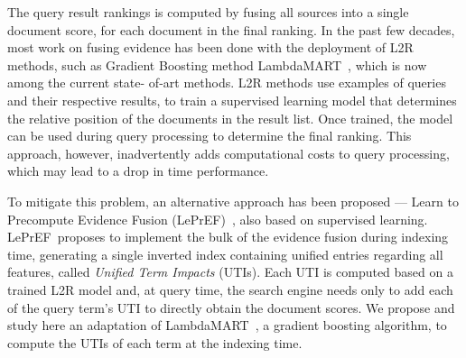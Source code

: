 \documentclass[preprint,review,10pt,3p]{elsarticle}
\begin{document}

The query result rankings is computed by fusing all sources into a single document score, for each document in the final ranking. In the past few decades, most work on fusing evidence has been done with the deployment of L2R methods, such as  Gradient Boosting method LambdaMART~\cite{wu2010lambdamart}, which is now among the current state- of-art methods. L2R methods use examples of queries and their respective results, to train a supervised learning model that determines the relative position of the documents in the result list. Once trained, the model can be used during query processing to determine the final ranking. This approach, however, inadvertently adds computational costs to query processing, which may lead to a drop in time  performance.


\newcommand{\lepref}{LePrEF}
\newcommand{\lambdamart}{LambdaMART}

To mitigate this problem, an alternative approach has been proposed --- Learn to Precompute Evidence Fusion (\lepref)~\cite{costa2012lepref}, also based on supervised learning. \lepref\ proposes to implement the bulk of the evidence fusion during indexing time, generating a single inverted index containing unified entries regarding all features, called \textit{Unified Term Impacts} (UTIs). 
Each UTI is computed based on a trained L2R model and, at query time, the search engine needs only to add each of the query term's UTI to directly obtain the document scores.
We  propose and study here an adaptation of \lambdamart~\cite{wu2010lambdamart}, a gradient boosting algorithm, to compute the UTIs of each term at the indexing time. 
\end{document}
